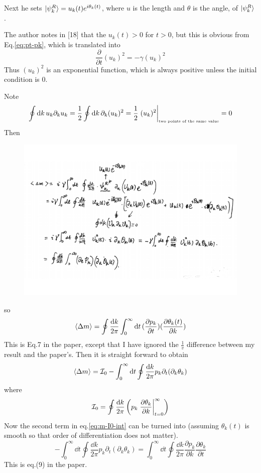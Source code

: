 \documentclass{article}
\begin{document}
Next he sets $\ket{\psi^R_k}=u_k(t)e^{i\theta_k(t)}$, where $u$ is the
length and $\theta$ is the angle, of $\ket{\psi^R_k}$.

The author notes in [18] that the $u_k(t)>0$ for $t>0$, but this is
obvious from Eq.\ref{eq:pt-pk}, which is translated into
\begin{equation}
    \frac{\partial }{\partial t}(u_k)^2 = -\gamma (u_k)^2
\end{equation}
Thus $(u_k)^2$ is an exponential function, which is always positive
unless the initial condition is $0$.

Note
\begin{equation}
    \oint\dd{k} u_k\partial_k u_k 
    = \frac{1}{2}\oint\dd{k}\partial_k (u_k)^2 =
    \frac{1}{2}\eval{(u_k)^2}_{\textrm{\tiny two points of the same value}} = 0
\end{equation}
Then
\begin{figure}[H]
    \centering
    \includegraphics[width=0.8\linewidth]{pics/eq7.pdf}
\end{figure}
so
\begin{equation}
    \braket{\Delta m}=\oint\frac{\dd{k}}{2\pi}\int_0^\infty\dd{t}
    (\frac{\partial p_k}{\partial t})
    (\frac{\partial \theta_k(t)}{\partial k})
\end{equation}
This is Eq.7 in the paper, except that I have ignored the $\frac{1}{v}$
difference between my result and the paper's. Then it is straight
forward to obtain
\begin{equation}
    \braket{\Delta m} = \mathcal{I}_0 - \int_0^\infty\dd{t}
    \oint\frac{\dd{k}}{2\pi} p_k \partial_t (\partial_k \theta_k)
    \label{eq:m-I0-int}
\end{equation}
where
\begin{equation}
    \mathcal{I}_0 = \oint\frac{\dd{k}}{2\pi} \left(p_k
    \eval{\frac{\partial \theta_k}{\partial k}}_{t=0}^\infty\right)
\end{equation}
Now the second term in eq.\ref{eq:m-I0-int} can be turned into
(assuming $\theta_k(t)$ is smooth so that order of differentiation
does not matter).
\begin{equation}
    - \int_0^\infty\dd{t}
    \oint\frac{\dd{k}}{2\pi} p_k \partial_t (\partial_k \theta_k)
    =
    \int_0^\infty\dd{t}
    \oint\frac{\dd{k}}{2\pi} 
    \frac{\partial p_k}{\partial k}
    \frac{\partial \theta_k}{\partial t}
    \label{eq:to-be-0}
\end{equation}
This is eq.(9) in the paper.
\end{document}
